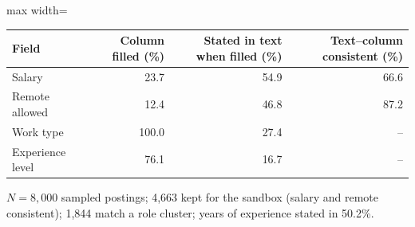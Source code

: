 {\small
\begin{adjustbox}{max width=\linewidth}
\begin{tabular}{l r r r}
\toprule
Field & Column filled (\%) & Stated in text when filled (\%) & Text--column consistent (\%) \\
\midrule
Salary & 23.7 & 54.9 & 66.6 \\
Remote allowed & 12.4 & 46.8 & 87.2 \\
Work type & 100.0 & 27.4 & -- \\
Experience level & 76.1 & 16.7 & -- \\
\bottomrule
\end{tabular}
\end{adjustbox}

\smallskip
{\footnotesize $N=8,000$ sampled postings; 4,663 kept for the sandbox (salary and remote consistent); 1,844 match a role cluster; years of experience stated in 50.2\%.\par}
}
